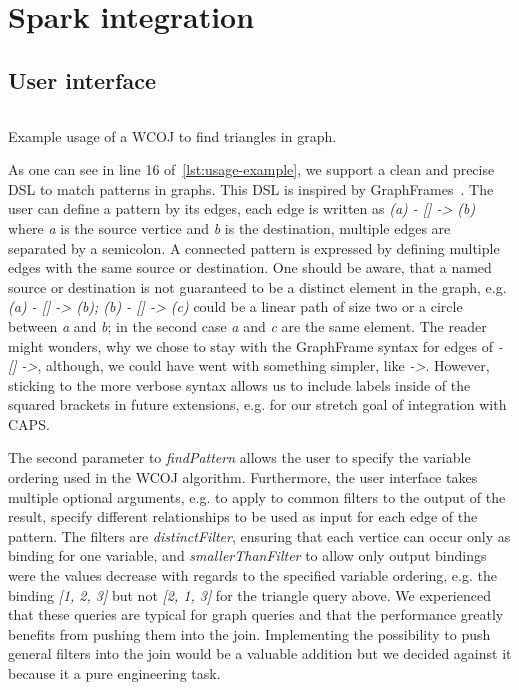 \section{Spark integration}\label{sec:spark-integration}

\subsection{User interface} \label{ssec:user-interface}
\begin{listing}[H]
    \inputminted{scala}{code/usage-example.scala}
    \caption{Example usage of a WCOJ to find triangles in graph.}
    \label{lst:usage-example}
\end{listing}

As one can see in line 16 %
of~\cref{lst:usage-example}, we support a clean and precise DSL to match patterns in graphs.
This DSL is inspired by GraphFrames~\cite{graphframe}.
The user can define a pattern by its edges, each edge is written as \textit{(a) - [] -> (b)} where \textit{a} is the
source vertice and \textit{b} is the destination, multiple edges are separated by a semicolon.
A connected pattern is expressed by defining multiple edges with the same source or destination.
One should be aware, that a named source or destination is not guaranteed to be a distinct element in the graph,
e.g. \textit{(a) - [] -> (b); (b) - [] -> (c)} could be a linear path of size two or a circle between \textit{a} and
\textit{b}; in the second case \textit{a} and \textit{c} are the same element.
The reader might wonders, why we chose to stay with the GraphFrame syntax for edges of
\textit{- [] ->}, although, we could have went with something simpler, like \textit{->}.
However, sticking to the more verbose syntax allows us to include labels inside of the squared brackets
in future extensions, e.g. for our stretch goal of integration with CAPS.

The second parameter to \textit{findPattern} allows the user to specify the variable ordering used in the WCOJ algorithm.
Furthermore, the user interface takes multiple optional arguments, e.g. to apply to common filters to the output of the result,
specify different relationships to be used as input for each edge of the pattern.
The filters are \textit{distinctFilter}, ensuring that each vertice can occur only as binding for one variable, and
\textit{smallerThanFilter} to allow only output bindings were the values decrease with regards to the specified variable ordering,
e.g. the binding \textit{[1, 2, 3]} but not \textit{[2, 1, 3]} for the triangle query above.
We experienced that these queries are typical for graph queries and that the performance greatly benefits from pushing
them into the join.
Implementing the possibility to push general filters into the join would be a valuable addition but we decided against it because
it a pure engineering task.




